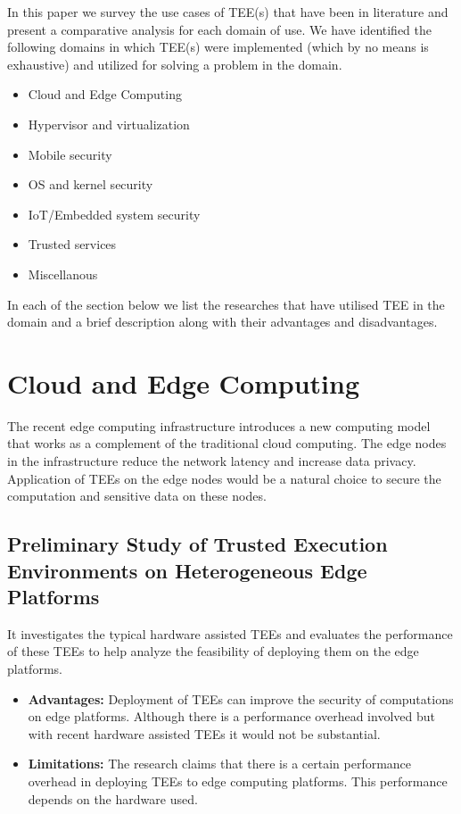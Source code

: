 \documentclass[conference]{IEEEtran}
\begin{document}
In this paper we survey the use cases of TEE(s) that have been in literature and present a comparative analysis for each domain of use. We have identified the following domains in which TEE(s) were implemented (which by no means is exhaustive) and utilized for solving a problem in the domain.
\begin{itemize}
    \item Cloud and Edge Computing
    \item Hypervisor and virtualization
    \item Mobile security
    \item OS and kernel security
    \item IoT/Embedded system security
    \item Trusted services
    \item Miscellanous
\end{itemize}

In each of the section below we list the researches that have utilised TEE in the domain and a brief description along with their advantages and disadvantages.


\section{Cloud and Edge Computing}
The recent edge computing infrastructure introduces a new computing model that works as a complement
of the traditional cloud computing. The edge nodes in the
infrastructure reduce the network latency and increase data privacy.
Application of TEEs on the edge nodes would
be a natural choice to secure the computation and sensitive data
on these nodes.
\subsection{Preliminary Study of Trusted Execution Environments on Heterogeneous Edge Platforms }
\cite{cloud1} It investigates the typical hardware assisted TEEs and evaluates the performance of these TEEs to help analyze the feasibility of deploying them on the edge platforms.
\begin{itemize}
    \item \textbf{Advantages:} Deployment of TEEs can improve the security of computations on edge platforms. Although there is a performance overhead involved but with recent hardware assisted TEEs it would not be substantial.
    \item \textbf{Limitations:} The research claims that there is a certain performance overhead in deploying TEEs to edge computing platforms. This performance depends on the hardware used.
\end{itemize}
\end{document}
